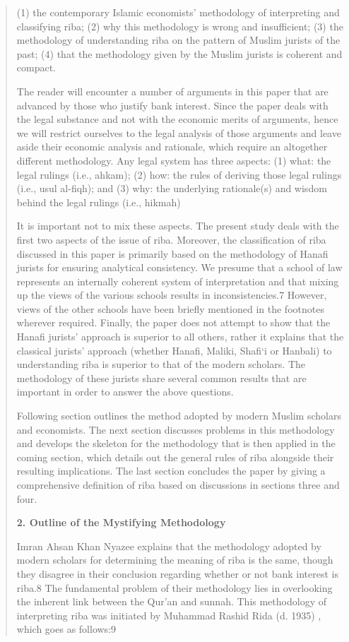 \begin{quote}
(1) the contemporary Islamic economists' methodology of interpreting and classifying riba; (2) why this methodology is wrong and insufficient; (3) the methodology of understanding riba on the pattern of Muslim jurists of the past; (4) that the methodology given by the Muslim jurists is coherent and compact.

The reader will encounter a number of arguments in this paper that are advanced by those who justify bank interest. Since the paper deals with the legal substance and not with the economic merits of arguments, hence we will restrict ourselves to the legal analysis of those arguments and leave aside their economic analysis and rationale, which require an altogether different methodology. Any legal system has three aspects: (1) what: the legal rulings (i.e., ahkam); (2) how: the rules of deriving those legal rulings (i.e., usul al-fiqh); and (3) why: the underlying rationale(s) and wisdom behind the legal rulings (i.e., hikmah)

It is important not to mix these aspects. The present study deals with the first two aspects of the issue of riba. Moreover, the classification of riba discussed in this paper is primarily based on the methodology of Hanafi jurists for ensuring analytical consistency. We presume that a school of law represents an internally coherent system of interpretation and that mixing up the views of the various schools results in inconsistencies.7 However, views of the other schools have been briefly mentioned in the footnotes wherever required. Finally, the paper does not attempt to show that the Hanafi jurists' approach is superior to all others, rather it explains that the classical jurists' approach (whether Hanafi, Maliki, Shafi‘i or Hanbali) to understanding riba is superior to that of the modern scholars. The methodology of these jurists share several common results that are important in order to answer the above questions.

Following section outlines the method adopted by modern Muslim scholars and economists. The next section discusses problems in this methodology and develops the skeleton for the methodology that is then applied in the coming section, which details out the general rules of riba alongside their resulting implications. The last section concludes the paper by giving a comprehensive definition of riba based on discussions in sections three and four.

\textbf{2. Outline of the Mystifying Methodology}

Imran Ahsan Khan Nyazee explains that the methodology adopted by modern scholars for determining the meaning of riba is the same, though they disagree in their conclusion regarding whether or not bank interest is riba.8 The fundamental problem of their methodology lies in overlooking the inherent link between the Qur'an and sunnah. This methodology of interpreting riba was initiated by Muhammad Rashid Rida (d. 1935) , which goes as follows:9


\end{quote}

